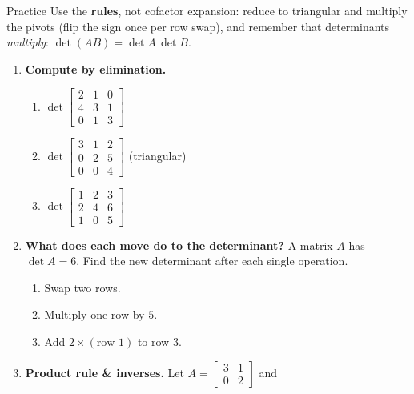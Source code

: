\documentclass[10pt]{article}
\begin{document}
\namedateperiod

\vspace{0.12in}

\begin{notesbox}{Practice}
Use the \textbf{rules}, not cofactor expansion: reduce to triangular and multiply the pivots (flip the
sign once per row swap), and remember that determinants \emph{multiply}: $\det(AB)=\det A\,\det B$.

\begin{enumerate}[leftmargin=1.9em, itemsep=11pt]
  \item \textbf{Compute by elimination.}
    \begin{enumerate}[label=(\alph*), leftmargin=1.8em, itemsep=5pt]
      \item $\det\begin{bmatrix} 2 & 1 & 0 \\ 4 & 3 & 1 \\ 0 & 1 & 3 \end{bmatrix}$ \hfill
      \item $\det\begin{bmatrix} 3 & 1 & 2 \\ 0 & 2 & 5 \\ 0 & 0 & 4 \end{bmatrix}$ \; {\footnotesize(triangular)} \hfill
      \item $\det\begin{bmatrix} 1 & 2 & 3 \\ 2 & 4 & 6 \\ 1 & 0 & 5 \end{bmatrix}$
    \end{enumerate}
    \vspace{1.3cm}
  \item \textbf{What does each move do to the determinant?} A matrix $A$ has $\det A=6$. Find the new
        determinant after each single operation.
    \begin{enumerate}[label=(\alph*), leftmargin=1.8em, itemsep=5pt]
      \item Swap two rows. \hfill \blank{2.2cm}
      \item Multiply one row by $5$. \hfill \blank{2.2cm}
      \item Add $2\times(\text{row }1)$ to row $3$. \hfill \blank{2.2cm}
    \end{enumerate}
    \vspace{0.5cm}
  \item \textbf{Product rule \& inverses.} Let $A=\begin{bmatrix} 3 & 1 \\ 0 & 2 \end{bmatrix}$ and

\end{enumerate}
\end{notesbox}
\end{document}
